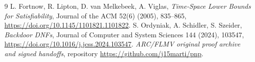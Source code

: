 \documentclass[11pt]{article}
\begin{document}
\begin{thebibliography}{9}
 L. Fortnow, R. Lipton, D. van Melkebeek, A. Viglas,
\emph{Time-Space Lower Bounds for Satisfiability},
Journal of the ACM 52(6) (2005), 835--865,
\url{https://doi.org/10.1145/1101821.1101822}.
 S. Ordyniak, A. Schidler, S. Szeider,
\emph{Backdoor DNFs}, Journal of Computer and System Sciences 144
(2024), 103547, \url{https://doi.org/10.1016/j.jcss.2024.103547}.
 \emph{ARC/FLMV original proof archive and signed handoffs},
repository \url{https://github.com/j15marti/pnp}.
\end{thebibliography}
\end{document}
